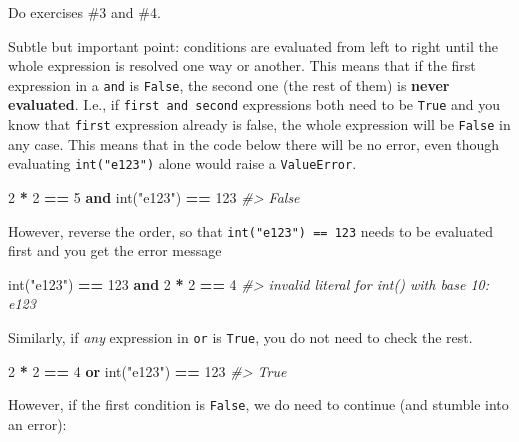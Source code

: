 \documentclass[
]{book}
\newenvironment{Shaded}{\begin{snugshade}}{\end{snugshade}}
\newcommand{\BuiltInTok}[1]{#1}
\newcommand{\CommentTok}[1]{\textcolor[rgb]{0.56,0.35,0.01}{\textit{#1}}}
\newcommand{\DecValTok}[1]{\textcolor[rgb]{0.00,0.00,0.81}{#1}}
\newcommand{\KeywordTok}[1]{\textcolor[rgb]{0.13,0.29,0.53}{\textbf{#1}}}
\newcommand{\NormalTok}[1]{#1}
\newcommand{\OperatorTok}[1]{\textcolor[rgb]{0.81,0.36,0.00}{\textbf{#1}}}
\newcommand{\StringTok}[1]{\textcolor[rgb]{0.31,0.60,0.02}{#1}}
\begin{document}
Do exercises \#3 and \#4.

Subtle but important point: conditions are evaluated from left to right until the whole expression is resolved one way or another. This means that if the first expression in a \texttt{and} is \texttt{False}, the second one (the rest of them) is \textbf{never evaluated}. I.e., if \texttt{first\ and\ second} expressions both need to be \texttt{True} and you know that \texttt{first} expression already is false, the whole expression will be \texttt{False} in any case. This means that in the code below there will be no error, even though evaluating \texttt{int("e123")} alone would raise a \texttt{ValueError}.

\begin{Shaded}
\begin{Highlighting}[]
\DecValTok{2} \OperatorTok{*} \DecValTok{2} \OperatorTok{==} \DecValTok{5} \KeywordTok{and} \BuiltInTok{int}\NormalTok{(}\StringTok{"e123"}\NormalTok{) }\OperatorTok{==} \DecValTok{123}
\CommentTok{\#\textgreater{} False}
\end{Highlighting}
\end{Shaded}

However, reverse the order, so that \texttt{int("e123")\ ==\ 123} needs to be evaluated first and you get the error message

\begin{Shaded}
\begin{Highlighting}[]
\BuiltInTok{int}\NormalTok{(}\StringTok{"e123"}\NormalTok{) }\OperatorTok{==} \DecValTok{123} \KeywordTok{and} \DecValTok{2} \OperatorTok{*} \DecValTok{2} \OperatorTok{==} \DecValTok{4}
\CommentTok{\#\textgreater{} invalid literal for int() with base 10: \textquotesingle{}e123\textquotesingle{}}
\end{Highlighting}
\end{Shaded}

Similarly, if \emph{any} expression in \texttt{or} is \texttt{True}, you do not need to check the rest.

\begin{Shaded}
\begin{Highlighting}[]
\DecValTok{2} \OperatorTok{*} \DecValTok{2} \OperatorTok{==} \DecValTok{4} \KeywordTok{or} \BuiltInTok{int}\NormalTok{(}\StringTok{"e123"}\NormalTok{) }\OperatorTok{==} \DecValTok{123}
\CommentTok{\#\textgreater{} True}
\end{Highlighting}
\end{Shaded}

However, if the first condition is \texttt{False}, we do need to continue (and stumble into an error):
\end{document}
